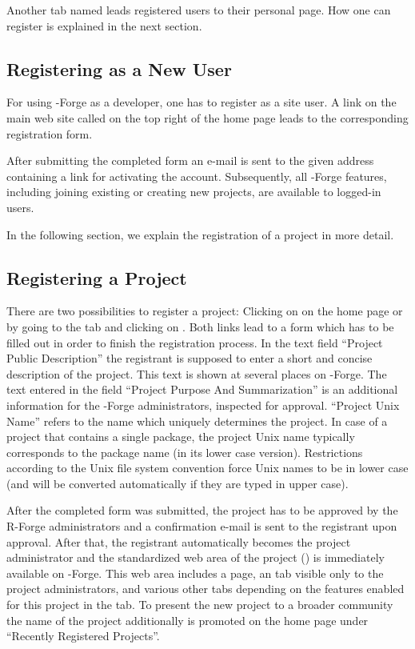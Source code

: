 Another tab named  leads registered users
to their personal page. How one can register is explained in
the next section.

\subsection{Registering as a New User}

For using \R{}-Forge as a developer, one has
to register as a site user. A link on the main web site called
 on the top right of the home page leads to the
corresponding registration form.

After submitting the completed form an e-mail is sent to the given
address containing a link for activating the account. Subsequently,
all \R{}-Forge features, including joining existing or creating
new projects, are available to logged-in users.

In the following section, we explain the registration of a project in
more detail.  

\subsection{Registering a Project}

There are two possibilities to register a project: Clicking on
 on the home page or by going to the  tab and clicking on . Both links lead to a
form which has to be filled out in order to finish the registration
process. In the text field ``Project Public Description'' the
registrant is supposed to enter a short and concise description of the
project. This text is shown at several places on \R{}-Forge. The text
entered in the field ``Project Purpose And Summarization'' is an
additional information for the \R{}-Forge administrators, inspected
for approval. ``Project Unix
Name'' refers to the name which 
uniquely determines the project. In case of a project that contains a
single \R{} package, the project Unix name typically corresponds to
the package name (in its lower case version). Restrictions according to
the Unix file system convention force Unix names to be in lower case
(and will be converted automatically if they are typed in upper case).

After the completed form was submitted, the project has to be approved
by the R-Forge administrators and a confirmation e-mail is sent to the
registrant upon approval. After that, the registrant automatically
becomes the project administrator and the standardized web area of the
project () is
immediately available on \R{}-Forge. 
This web area includes a  page, an  tab
visible only to the project administrators, and various other tabs
depending on the features enabled for this project in the 
tab. To present the new project to a broader community the name of the
project additionally is promoted on the home page under ``Recently
Registered Projects''.

